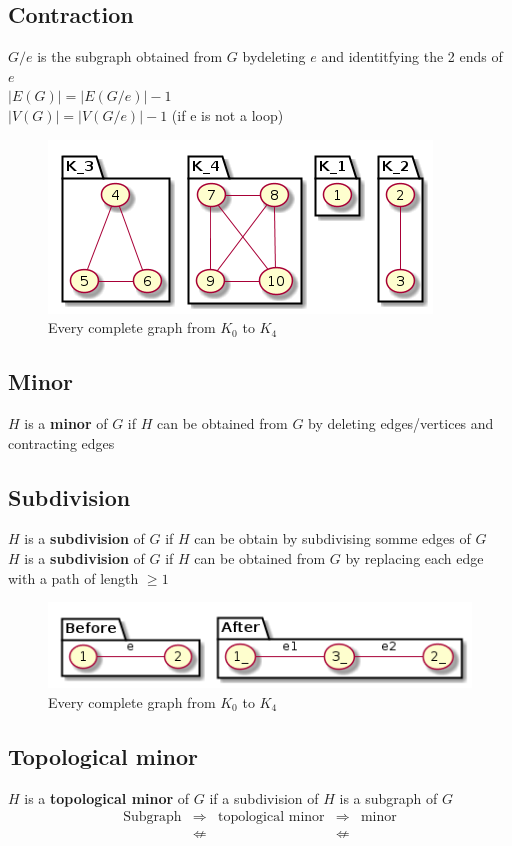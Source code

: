     \subsection{Contraction}
        $G/e$ is the subgraph obtained from $G$ bydeleting $e$ and identitfying the 2 ends of $e$\\
        $|E(G)|=|E(G/e)|-1$\\
        $|V(G)|=|V(G/e)|-1$ (if e is not a loop)\\
        \begin{figure}[h]%
            \centering
            \includegraphics[scale=0.5]{ressources/images/CompleteGraphs.png}
            \caption{Every complete graph from $K_0$ to $K_4$}
            \label{Complete graph}
        \end{figure}
    \subsection{Minor}
        $H$ is a \textbf{minor} of $G$ if $H$ can be obtained from $G$ by deleting edges/vertices and contracting edges
    \subsection{Subdivision}
    $H$ is a \textbf{subdivision} of $G$ if $H$ can be obtain by subdivising somme edges of $G$\\
    $H$ is a \textbf{subdivision} of $G$ if $H$ can be obtained from $G$ by replacing each edge with a path of length $\geq 1$
        \begin{figure}[h]
            \centering
            \includegraphics[scale=0.5]{ressources/images/SubDivision.png}
            \caption{Every complete graph from $K_0$ to $K_4$}
            \label{Complete graph}
        \end{figure}
    \subsection{Topological minor}
        $H$ is a \textbf{topological minor} of $G$ if a subdivision of $H$ is a subgraph of $G$\\
            \[\begin{array}{ccccc}
                \text{Subgraph} & \Rightarrow & \text{topological minor} & \Rightarrow & \text{minor}\\
                & \not\Leftarrow & & \not\Leftarrow & 
            \end{array}\]

